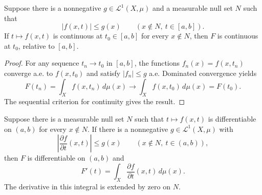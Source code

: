 \begin{theorem}
  \label{thm:parameter-continuity-sep-29}
  Suppose there is a nonnegative $g\in\mathcal L^1(X,\mu)$ and a
  measurable null set $N$ such that
  \[
    |f(x,t)|\leq g(x)\qquad(x\notin N,\ t\in[a,b]).
  \]
  If $t\mapsto f(x,t)$ is continuous at $t_0\in[a,b]$ for every
  $x\notin N$, then $F$ is continuous at $t_0$, relative to $[a,b]$.
\end{theorem}

\begin{proof}
  For any sequence $t_n\to t_0$ in $[a,b]$, the functions
  $f_n(x)=f(x,t_n)$ converge a.e. to $f(x,t_0)$ and satisfy
  $|f_n|\leq g$ a.e. Dominated convergence yields
  \[
    F(t_n)=\int_X f(x,t_n)\,d\mu(x)
      \longrightarrow\int_X f(x,t_0)\,d\mu(x)=F(t_0).
  \]
  The sequential criterion for continuity gives the result.
\end{proof}

\begin{theorem}
  \label{thm:parameter-differentiation-sep-29}
  Suppose there is a measurable null set $N$ such that
  $t\mapsto f(x,t)$ is differentiable on $(a,b)$ for every
  $x\notin N$. If there is a nonnegative
  $g\in\mathcal L^1(X,\mu)$ with
  \[
    \left|\frac{\partial f}{\partial t}(x,t)\right|\leq g(x)
    \qquad(x\notin N,\ t\in(a,b)),
  \]
  then $F$ is differentiable on $(a,b)$ and
  \[
    F'(t)=\int_X\frac{\partial f}{\partial t}(x,t)\,d\mu(x).
  \]
  The derivative in this integral is extended by zero on $N$.
\end{theorem}

